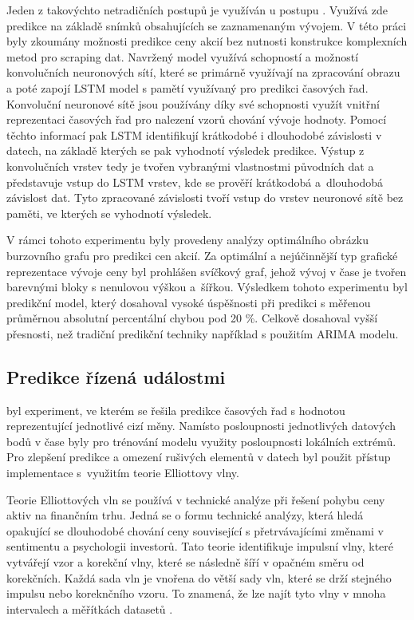 Jeden z takovýchto netradičních postupů je využíván u postupu  \cite{cnn-lstm}.
Využívá zde predikce na základě snímků obsahujících se zaznamenaným vývojem. 
V této práci byly zkoumány možnosti predikce ceny akcií bez nutnosti konstrukce komplexních metod pro scraping dat. 
Navržený model využívá schopností a možností konvolučních neuronových sítí, které se primárně využívají na zpracování obrazu a poté zapojí LSTM model s pamětí využívaný pro predikci časových řad. 
Konvoluční neuronové sítě jsou používány díky své schopnosti využít vnitřní reprezentaci časových řad pro nalezení vzorů chování vývoje hodnoty. 
Pomocí těchto informací pak LSTM identifikují krátkodobé i dlouhodobé závislosti v datech, na základě kterých se pak vyhodnotí výsledek predikce. 
Výstup z konvolučních vrstev tedy je tvořen vybranými vlastnostmi původních dat a představuje vstup do LSTM vrstev, kde se prověří krátkodobá a~dlouhodobá závislost dat. Tyto zpracované závislosti tvoří vstup do vrstev neuronové sítě bez paměti, ve kterých se vyhodnotí výsledek.

V rámci tohoto experimentu byly provedeny analýzy optimálního obrázku burzovního grafu pro predikci cen akcií. 
Za optimální a nejúčinnější typ grafické reprezentace vývoje ceny byl prohlášen svíčkový graf, jehož vývoj v čase je tvořen barevnými bloky s nenulovou výškou a~šířkou.
Výsledkem tohoto experimentu byl predikční model, který dosahoval vysoké úspěšnosti při predikci s měřenou průměrnou absolutní percentální chybou pod 20 \%.
Celkově dosahoval vyšší přesnosti, než tradiční predikční techniky například s použitím ARIMA modelu.

\subsection{Predikce řízená událostmi}

 \cite{event-driven} byl experiment, ve kterém se řešila predikce časových řad s hodnotou reprezentující jednotlivé cizí měny. 
Namísto posloupnosti jednotlivých datových bodů v čase byly pro trénování modelu využity posloupnosti lokálních extrémů. 
Pro zlepšení predikce a omezení rušivých elementů v datech byl použit přístup implementace s~využitím teorie Elliottovy vlny. 

Teorie Elliottových vln se používá v technické analýze při řešení pohybu ceny aktiv na finančním trhu. 
Jedná se o formu technické analýzy, která hledá opakující se dlouhodobé chování ceny související s přetrvávajícími změnami v sentimentu a psychologii investorů. 
Tato teorie identifikuje impulsní vlny, které vytvářejí vzor a korekční vlny, které se následně šíří v opačném směru od korekčních. 
Každá sada vln je vnořena do větší sady vln, které se drží stejného impulsu nebo koreknčního vzoru. 
To znamená, že lze najít tyto vlny v mnoha intervalech a měřítkách datasetů \cite{elliot}.

